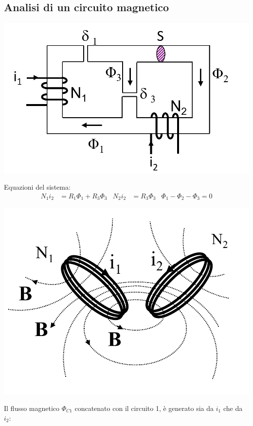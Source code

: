 \documentclass{article}
\begin{document}
\subsection{Analisi di un circuito magnetico}
\begin{center}
    \includegraphics[scale=0.27]{Image/Analisi_circuito_magnetico_1.png}
\end{center}
Equazioni del sistema:
\begin{align*}
    N_1i_2 &= R_1 \Phi_1 + R_3\Phi_3 
    &
    N_2i_2 &= R_3\Phi_3
    &
    \Phi_1-\Phi_2-\Phi_3=0
\end{align*}
\begin{center}
    \includegraphics[scale=0.27]{Image/Induttori_accoppiati_1.png}
\end{center}
Il flusso magnetico $\Phi_{C1}$ concatenato con il circuito 1, è generato sia da $i_1$ che da $i_2$:
\end{document}
